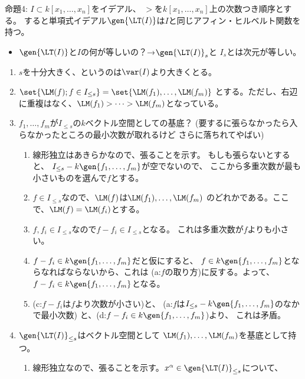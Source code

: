 \begin{framed}
  命題4:
  $I\subset k[x_1,\dots,x_n]$をイデアル、
  $>$を$k[x_1,\dots,x_n]$上の次数つき順序とする。
  すると単項式イデアル$\gen{\LT(I)}$は$I$と同じアフィン・ヒルベルト関数を持つ。
\end{framed}
\begin{itemize}
  \item $\gen{\LT(I)}$と$I$の何が等しいの？→$\gen{\LT(I)}_s$と
  $I_s$とは次元が等しい。
\end{itemize}
\begin{myproof}
  \begin{enumerate}
    \item $s$を十分大きく、というのは$\var(I)$より大きくとる。
    \item $\set{\LM(f); f\in I_{\le s}} = \set{\LM(f_1),\dots, \LM(f_m)}$
    とする。ただし、右辺に重複はなく、$\LM(f_1) > \dots > \LM(f_m)$となっている。
    \item $f_1,\dots, f_m$が$I_{\le s}$の$k$ベクトル空間としての基底？
    (要するに張らなかったら入らなかったところの最小次数が取れるけど
    さらに落ちれてやばい)
    \begin{enumerate}
      \item 線形独立はあきらかなので、張ることを示す。
      もしも張らないとすると、
      $I_{\le s} - k\gen{f_1,\dots,f_m}$が空でないので、
      ここから多重次数が最も小さいものを選んで$f$とする。
      \item
      $f\in I_{\le s} $なので、$\LM(f)$は$\LM(f_1),\dots,\LM(f_m)$
      のどれかである。ここで、$\LM(f) = \LM(f_i)$とする。
      \item
      $f,f_i \in I_{\le s}$なので$f-f_i \in I_{\le s}$となる。
      これは多重次数が$f$よりも小さい。
      \item
      $f-f_i \in k\gen{f_1,\dots,f_m}$だと仮にすると、
      $f\in k\gen{f_1,\dots,f_m}$とならなればならないから、これは
      (a:$f$の取り方)に反する。よって、$f-f_i \in k\gen{f_1,\dots,f_m}$となる。
      \item
      (c:$f-f_i$は$f$より次数が小さい)と、
      (a:$f$は$I_{\le s} - k\gen{f_1,\dots,f_m}$のなかで最小次数)
      と、(d:$f-f_i \in k\gen{f_1,\dots,f_m}$)より、
      これは矛盾。
    \end{enumerate}
    \item
    $\gen{\LT(I)}_{\le s}$はベクトル空間として
    $\LM(f_1),\dots,\LM(f_m)$を基底として持つ。
    \begin{enumerate}
      \item 線形独立なので、張ることを示す。$x^\alpha \in \gen{\LT(I)}_{\le s}$について、

\end{enumerate}
\end{enumerate}
\end{myproof}
